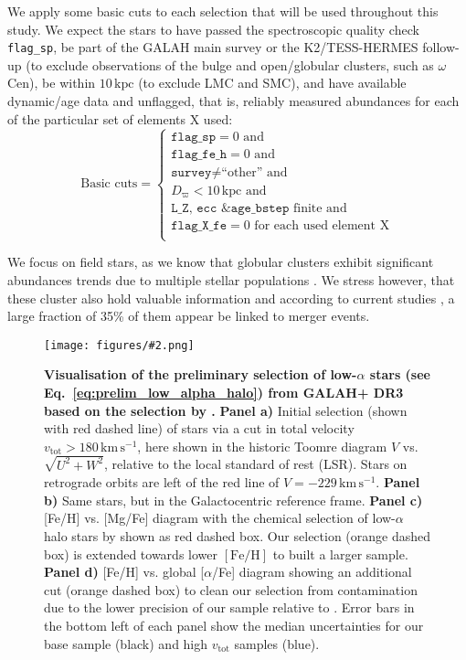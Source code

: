 \documentclass[fleqn,usenatbib]{mnras}
\newcommand{\kpc}{\,\mathrm{kpc}}	%
\newcommand{\kms}{\,\mathrm{km\,s^{-1}}}	%
\newcommand{\codeicon}{{\faCloudDownload}}
\newcommand{\codelink}[1]{\href{https://github.com/svenbuder/Accreted-stars-in-GALAH-DR3/tree/main/figures/#1.ipynb}{\codeicon}\,\,}
\newcommand{\oscaption}[2]{\caption{#2 \codelink{#1}}}
\newcommand{\figuretextwidth}[4]{\begin{figure*} \centering \texttt{[image: figures/\#2.png]}\oscaption{#3}{#4}\label{fig:#2} \end{figure*}}
\begin{document}
We apply some basic cuts to each selection that will be used throughout this study. We expect the stars to have passed the spectroscopic quality check \texttt{flag\_sp}, be part of the GALAH main survey or the K2/TESS-HERMES follow-up (to exclude observations of the bulge and open/globular clusters, such as $\omega$\,Cen), be within $10 \kpc$ (to exclude LMC and SMC), and have available dynamic/age data and unflagged, that is, reliably measured abundances for each of the particular set of elements X used:\begin{equation} \label{eq:basic_cuts}
\text{Basic cuts} = 
\begin{cases}
\texttt{flag\_sp} = 0 \text{ and} \\
\texttt{flag\_fe\_h} = 0 \text{ and} \\
\texttt{survey} \neq \text{``other'' and} \\
D_\varpi < 10\kpc \text{ and} \\
\texttt{L\_Z}\text{, }\texttt{ecc}\text{ \& }\texttt{age\_bstep} \text{ finite and} \\
\texttt{flag\_X\_fe} = 0 \text{ for each used element X} \\
\end{cases}
\end{equation}

We focus on field stars, as we know that globular clusters exhibit significant abundances trends due to multiple stellar populations \citep[e.g.][]{Carretta2009}. We stress however, that these cluster also hold valuable information and according to current studies \citep[e.g.][]{Massari2019, KochHansen2021}, a large fraction of 35\% of them appear be linked to merger events.

\figuretextwidth{17cm}{nissen_selection_corner}{chemical_differences}{
\textbf{Visualisation of the preliminary selection of low-$\alpha$ stars (see Eq.~\ref{eq:prelim_low_alpha_halo}) from GALAH+ DR3 based on the selection by \citet{Nissen2010}.}
\textbf{Panel a)} Initial selection (shown with red dashed line) of stars via a cut in total velocity $v_\text{tot} > 180\,\mathrm{km\,s^{-1}}$, here shown in the historic Toomre diagram $V$ vs. $\sqrt{U^2 + W^2}$, relative to the local standard of rest (LSR). Stars on retrograde orbits are left of the red line of $V = -229\kms$.
\textbf{Panel b)} Same stars, but in the Galactocentric reference frame.
\textbf{Panel c)} [Fe/H] vs. [Mg/Fe] diagram with the chemical selection of low-$\alpha$ halo stars by \citet{Nissen2010} shown as red dashed box. Our selection (orange dashed box) is extended towards lower $\mathrm{[Fe/H]}$ to built a larger sample.
\textbf{Panel d)} [Fe/H] vs. global [$\alpha$/Fe] diagram showing an additional cut (orange dashed box) to clean our selection from contamination due to the lower precision of our sample relative to \citet{Nissen2010}.
Error bars in the bottom left of each panel show the median uncertainties for our base sample (black) and high $v_\text{tot}$ samples (blue).
}
\end{document}
